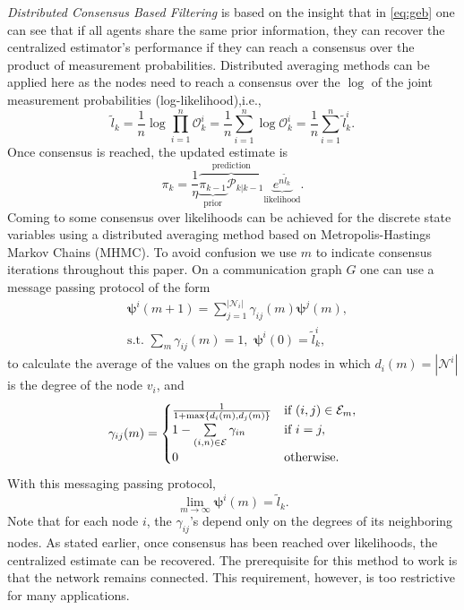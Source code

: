 \documentclass[conference]{IEEEtran}
\newcommand{\vect}[1]{{\mathbf{#1}}}
\theoremstyle{remark}
\begin{document}
\emph{Distributed Consensus Based Filtering} is based on the insight that in \eqref{eq:geb} one can see that if all agents share the same prior information, they can recover the centralized estimator's performance if they can reach a consensus over the product of measurement probabilities. Distributed averaging methods can be applied here as the nodes need to reach a consensus over the $\log$ of the joint measurement probabilities (log-likelihood),i.e.,
\begin{equation}
\tilde{l}_k  = \frac{1}{n} \log \prod_{i=1}^{n} \mathcal{O}_k^i  = \frac{1}{n} \sum_{i=1}^{n} \log \mathcal{O}_k^i = \frac{1}{n} \sum_{i=1}^{n} \tilde{l}_k^i.
\end{equation}
Once consensus is reached, the updated estimate is 
\begingroup\makeatletter\def\f@size{9}\check@mathfonts	
\begin{equation}
{\pi}_{k}  = \frac{1}{\eta}\overbrace{ \underbrace{{\pi}_{k-1}}_{\text{prior}} 
\mathcal{P}_{k \vert k-1}  
}^{\text{prediction}}\underbrace{e^{n\tilde{l}_k}}_{\text{likelihood}}.
\end{equation}
\endgroup
Coming to some consensus over likelihoods can be achieved for the discrete state variables using a distributed averaging method based on Metropolis-Hastings Markov Chains (MHMC). To avoid confusion we use $m$ to indicate consensus iterations throughout this paper. On a communication graph $G$ one can use a message passing protocol of the form 
\begin{align}
	&\vect{\psi}^i(m+1)=\textstyle {\sum\nolimits _{j=1}^{|\mathcal{N}_{i}|}} \gamma_{ij}(m)\vect{\psi}^j(m),\\
	& \text{s.t. } \sum_{m}  \gamma_{ij}(m) = 1,\,\,  \vect{\psi}^i(0)=  \tilde{l}_k^i,\nonumber
\end{align}
to calculate the average of the values on the graph nodes in which $d_{i}(m)=|\mathcal{N}^i|$ is the degree of the node $v_i$, and 
\begin{equation}
\label{eq:mhmc}
\gamma_{ij}(m) =
\begin{cases}
{1\over 1+\max\{d_{i}(m),d_{j}(m)\}}      &  \text{if } (i,j) \in \mathcal{E}_{m}, \\
1-\sum\limits_{{(i,n)} \in \mathcal{E}}\gamma_{in}  &  \text{if } i = j,\\
0 & \text{otherwise}.
\end{cases}
\end{equation}
With this messaging passing protocol, $$\lim_{m\rightarrow \infty} \vect{\psi}^i(m) = \tilde{l}_k.$$
 Note that for each node $i$, the $\gamma_{ij}$'s depend only on the degrees of its neighboring nodes. As stated earlier, once consensus has been reached over likelihoods, the centralized estimate can be recovered. The prerequisite for this method to work is that the network remains connected. This requirement, however, is too restrictive for many applications.
\end{document}
